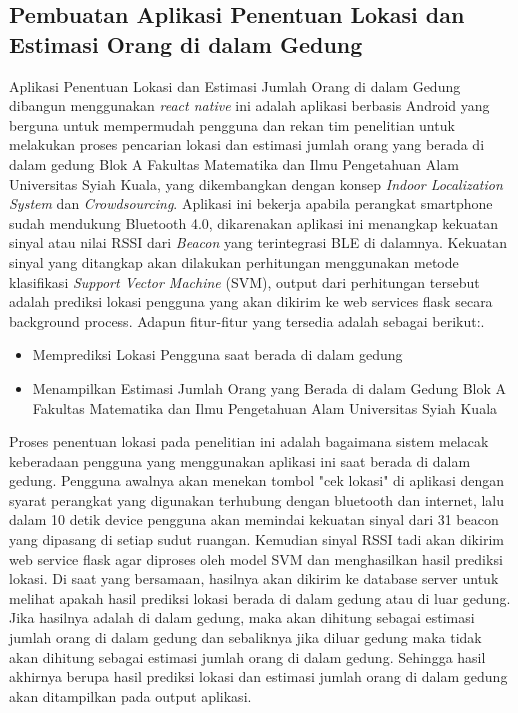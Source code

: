 \subsection{Pembuatan Aplikasi Penentuan Lokasi dan Estimasi Orang di dalam Gedung}
\par Aplikasi Penentuan Lokasi dan Estimasi Jumlah Orang di dalam Gedung dibangun menggunakan \textit{react native} ini adalah aplikasi berbasis Android yang berguna untuk mempermudah pengguna dan rekan tim penelitian untuk melakukan proses pencarian lokasi dan estimasi jumlah orang yang berada di dalam gedung Blok A Fakultas Matematika dan Ilmu Pengetahuan Alam Universitas Syiah Kuala, yang dikembangkan dengan konsep \textit{Indoor Localization System} dan \textit{Crowdsourcing}. Aplikasi ini bekerja apabila perangkat smartphone sudah mendukung Bluetooth 4.0, dikarenakan aplikasi ini menangkap kekuatan sinyal atau nilai RSSI dari \textit{Beacon} yang terintegrasi BLE di dalamnya. Kekuatan sinyal yang ditangkap akan dilakukan perhitungan menggunakan metode klasifikasi \textit{Support Vector Machine} (SVM), output dari perhitungan tersebut adalah prediksi lokasi pengguna yang akan dikirim ke web services flask secara background process. Adapun fitur-fitur yang tersedia adalah sebagai berikut:.

\begin {itemize}
\itemsep0em
\item Memprediksi Lokasi Pengguna saat berada di dalam gedung
\item Menampilkan Estimasi Jumlah Orang yang Berada di dalam Gedung Blok A Fakultas Matematika dan Ilmu Pengetahuan Alam Universitas Syiah Kuala
\end{itemize}

\par Proses penentuan lokasi pada penelitian ini adalah bagaimana sistem melacak keberadaan pengguna yang menggunakan aplikasi ini saat berada di dalam gedung.
Pengguna awalnya akan menekan tombol "cek lokasi" di aplikasi dengan syarat perangkat yang digunakan terhubung dengan bluetooth dan internet, lalu dalam 10 detik
device pengguna akan memindai kekuatan sinyal dari 31 beacon yang dipasang di setiap sudut ruangan. Kemudian sinyal RSSI tadi akan dikirim web service flask agar diproses
oleh model SVM dan menghasilkan hasil prediksi lokasi. Di saat yang bersamaan, hasilnya akan dikirim ke database server untuk melihat apakah hasil prediksi lokasi berada
di dalam gedung atau di luar gedung. Jika hasilnya adalah di dalam gedung, maka akan dihitung sebagai estimasi jumlah orang di dalam gedung dan sebaliknya jika diluar gedung maka tidak akan
dihitung sebagai estimasi jumlah orang di dalam gedung. Sehingga hasil akhirnya berupa hasil prediksi lokasi dan estimasi jumlah orang di dalam gedung akan ditampilkan pada output aplikasi.


